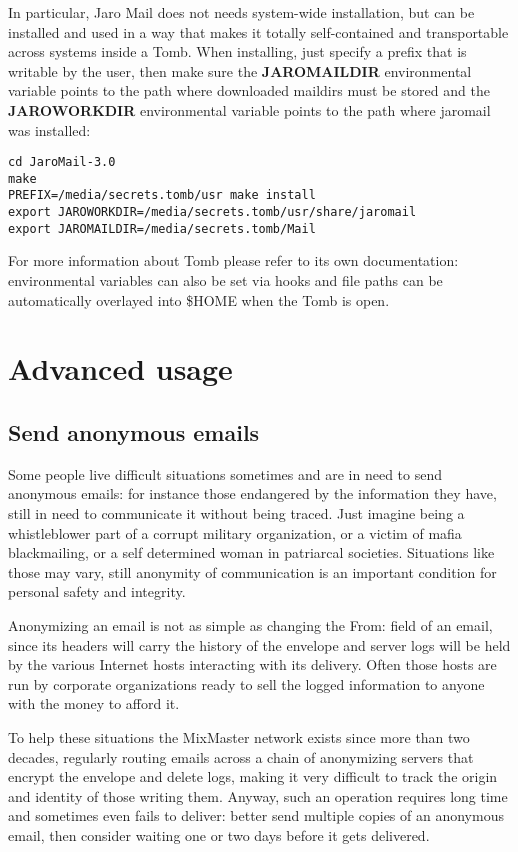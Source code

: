 \documentclass[a4,onecolumn,portrait]{article}
\begin{document}
In particular, Jaro Mail does not needs system-wide installation, but
can be installed and used in a way that makes it totally
self-contained and transportable across systems inside a Tomb. When
installing, just specify a prefix that is writable by the user, then
make sure the \textbf{JAROMAILDIR} environmental variable points to the path
where downloaded maildirs must be stored and the \textbf{JAROWORKDIR}
environmental variable points to the path where jaromail was
installed:

\begin{verbatim}
cd JaroMail-3.0
make
PREFIX=/media/secrets.tomb/usr make install
export JAROWORKDIR=/media/secrets.tomb/usr/share/jaromail
export JAROMAILDIR=/media/secrets.tomb/Mail
\end{verbatim}

For more information about Tomb please refer to its own documentation: environmental variables can also be set via hooks and file paths can be automatically overlayed into \$HOME when the Tomb is open.

\section{Advanced usage}
\label{sec-11}

\subsection{Send anonymous emails}
\label{sec-11-1}

Some people live difficult situations sometimes and are in need to
send anonymous emails: for instance those endangered by the
information they have, still in need to communicate it without
being traced. Just imagine being a whistleblower part of a corrupt
military organization, or a victim of mafia blackmailing, or a self
determined woman in patriarcal societies. Situations like those may
vary, still anonymity of communication is an important condition
for personal safety and integrity.

Anonymizing an email is not as simple as changing the From: field
of an email, since its headers will carry the history of the
envelope and server logs will be held by the various Internet hosts
interacting with its delivery. Often those hosts are run by
corporate organizations ready to sell the logged information to
anyone with the money to afford it.

To help these situations the MixMaster network exists since more
than two decades, regularly routing emails across a chain of
anonymizing servers that encrypt the envelope and delete logs,
making it very difficult to track the origin and identity of those
writing them. Anyway, such an operation requires long time and
sometimes even fails to deliver: better send multiple copies of an
anonymous email, then consider waiting one or two days before it
gets delivered.
\end{document}
